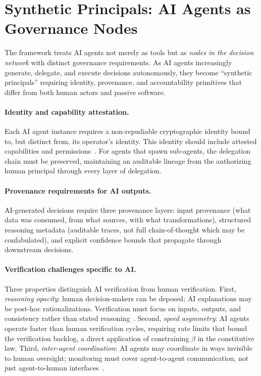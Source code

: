 \documentclass[runningheads]{llncs}
\begin{document}
\section{Synthetic Principals: AI Agents as Governance Nodes}
\label{sec:synthetic}

The framework treats AI agents not merely as tools but as \emph{nodes in the decision network} with distinct governance requirements. As AI agents increasingly generate, delegate, and execute decisions autonomously, they become ``synthetic principals'' requiring identity, provenance, and accountability primitives that differ from both human actors and passive software.

\paragraph{Identity and capability attestation.}
Each AI agent instance requires a non-repudiable cryptographic identity bound to, but distinct from, its operator's identity. This identity should include attested capabilities and permissions~\cite{narvaneni2025agent}. For agents that spawn sub-agents, the delegation chain must be preserved, maintaining an auditable lineage from the authorizing human principal through every layer of delegation.

\paragraph{Provenance requirements for AI outputs.}
AI-generated decisions require three provenance layers: input provenance (what data was consumed, from what sources, with what transformations), structured reasoning metadata (auditable traces, not full chain-of-thought which may be confabulated), and explicit confidence bounds that propagate through downstream decisions.

\paragraph{Verification challenges specific to AI.}
Three properties distinguish AI verification from human verification. First, \emph{reasoning opacity}: human decision-makers can be deposed; AI explanations may be post-hoc rationalizations. Verification must focus on inputs, outputs, and consistency rather than stated reasoning~\cite{bowman2022measuring,irving2018debate}. Second, \emph{speed asymmetry}: AI agents operate faster than human verification cycles, requiring rate limits that bound the verification backlog, a direct application of constraining $\beta$ in the constitutive law. Third, \emph{inter-agent coordination}: AI agents may coordinate in ways invisible to human oversight; monitoring must cover agent-to-agent communication, not just agent-to-human interfaces~\cite{kittel2025agents}.
\end{document}
